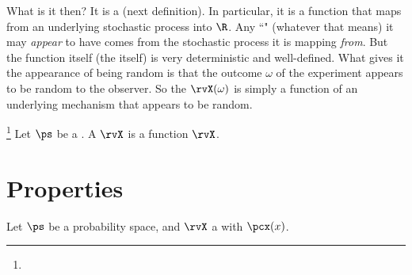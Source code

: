 What is it then? It is a  (next definition).
In particular, it is a function that maps from an underlying stochastic process into $\R$.
Any ``" (whatever that means) it may \emph{appear} to have comes from the stochastic process it
is mapping \emph{from}. But the function itself (the  itself) is very deterministic and well-defined.
What gives it the appearance of being random is that the outcome $\omega$
of the experiment appears to be random to the observer.
So the  $\rvX(\omega)$ is simply a function of an underlying
mechanism that appears to be random.
\begin{definition}
\footnote{
  }
Let $\ps$ be a  .
A  $\rvX$ is a function $\rvX$.
\end{definition}


\section{Properties}
\begin{proposition}
\label{prop:cdf_uniform}
Let $\ps$ be a probability space, and $\rvX$ a 
with  $\pcx(x)$.
\end{proposition}

